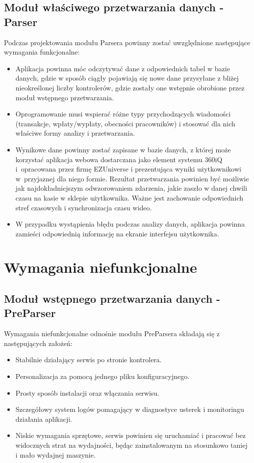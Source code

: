 \documentclass[a4paper]{book}
\begin{document}
\subsection{Moduł właściwego przetwarzania danych - Parser}
Podczas projektowania modułu Parsera powinny zostać uwzględnione następujące wymagania funkcjonalne:
\begin{itemize}
	\item Aplikacja powinna móc odczytywać dane z odpowiednich tabel w bazie danych, gdzie w sposób ciągły pojawiają się nowe dane przysyłane z bliżej nieokreślonej liczby kontrolerów, gdzie zostały one wstępnie obrobione przez moduł wstępnego przetwarzania.
	\item Oprogramowanie musi wspierać różne typy przychodzących wiadomości (transakcje, wpłaty/wypłaty, obecności pracowników) i stosować dla nich właściwe formy analizy i przetwarzania.
	\item Wynikowe dane powinny zostać zapisane w bazie danych, z której może korzystać aplikacja webowa dostarczana jako element systemu 360iQ i~opracowana przez firmę EZUniverse i prezentująca wyniki użytkownikowi w~przyjaznej dla niego formie. Rezultat przetwarzania powinien być możliwie jak najdokładniejszym odwzorowaniem zdarzenia, jakie zaszło w danej chwili czasu na kasie w sklepie użytkownika. Ważne jest zachowanie odpowiednich stref czasowych i synchronizacja czasu wideo.
	\item W przypadku wystąpienia błędu podczas analizy danych, aplikacja powinna zamieści odpowiednią informację na ekranie interfejsu użytkownika.
\end{itemize}
\section{Wymagania niefunkcjonalne}
\subsection{Moduł wstępnego przetwarzania danych - PreParser}
Wymagania niefunkcjonalne odnośnie modułu PreParsera składają się z następujących założeń:
\begin{itemize}
	\item Stabilnie działający serwis po stronie kontrolera.
	\item Personalizacja za pomocą jednego pliku konfiguracyjnego.
	\item Prosty sposób instalacji oraz włączania serwisu.
	\item Szczegółowy system logów pomagający w diagnostyce usterek i monitoringu działania aplikacji.
	\item Niskie wymagania sprzętowe, serwis powinien się uruchamiać i pracować bez widocznych strat na wydajności, będąc zainstalowanym na stosunkowo taniej i mało wydajnej maszynie.
\end{itemize}
\end{document}
